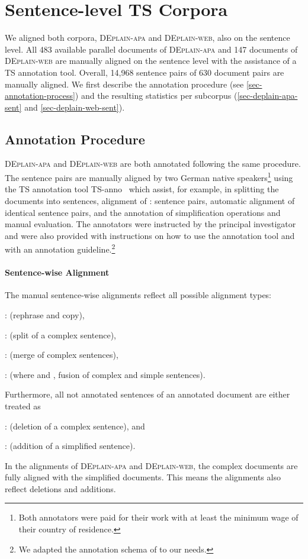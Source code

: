 \documentclass[11pt]{article}
\begin{document}
\section{Sentence-level TS Corpora}
We aligned both corpora, \textsc{DEplain-apa} and \textsc{DEplain-web}, also on the sentence level. All 483 available parallel documents of \textsc{DEplain-apa}  and 147 documents of \textsc{DEplain-web} are manually aligned on the sentence level with the assistance of a TS annotation tool. Overall, 14,968 sentence pairs of 630  document pairs are manually aligned. We first describe the annotation procedure (see \autoref{sec-annotation-process}) and the resulting statistics per subcorpus (\autoref{sec-deplain-apa-sent} and \autoref{sec-deplain-web-sent}). 




\subsection{Annotation Procedure}
\label{sec-annotation-process}
\textsc{DEplain-apa} and \textsc{DEplain-web} are both annotated following the same procedure. The sentence pairs are manually aligned by two German native speakers\footnote{Both annotators  were paid for their work with at least the minimum wage of their country of residence.} using the TS annotation tool TS-anno~\cite{stodden-kallmeyer-2022-ts} which assist, for example, in splitting the documents into sentences, alignment of : sentence pairs, automatic alignment of identical sentence pairs, and the annotation of simplification operations and manual evaluation. The annotators were instructed by the principal investigator and were also provided with instructions on how to use the annotation tool and with an annotation guideline.\footnote{We adapted the annotation schema of \citet{stodden-kallmeyer-2022-ts} to our needs.} 
\paragraph{Sentence-wise Alignment}
 The manual sentence-wise alignments reflect all possible alignment types: 
\begin{enumerate*}[label=\roman*)]
    \item : (rephrase and copy), 
    \item : (split of a complex sentence), 
    \item : (merge of complex sentences), 
    \item : (where  and , fusion of complex and simple sentences).
\end{enumerate*}
Furthermore, all not annotated sentences of an annotated document are either treated as 
\begin{enumerate*}[label=\roman*)]
  \setcounter{enumi}{4}
    \item : (deletion of a complex sentence), and 
    \item : (addition of a simplified sentence).
\end{enumerate*}\par
In the alignments of \textsc{DEplain-apa} and \textsc{DEplain-web}, the complex documents are fully aligned with the simplified documents. This means the alignments also reflect deletions  and additions.
\end{document}
